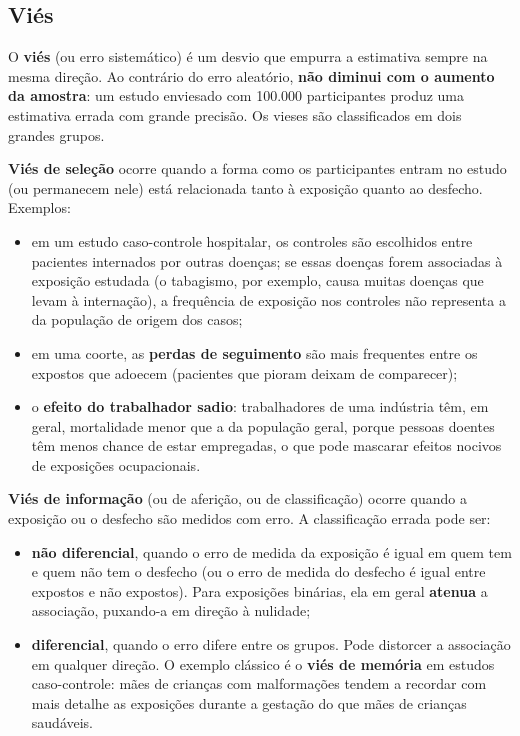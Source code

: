 \documentclass[
]{book}
\providecommand{\tightlist}{%
  \setlength{\itemsep}{0pt}\setlength{\parskip}{0pt}}
\begin{document}
\subsection{Viés}\label{viuxe9s}

O \textbf{viés} (ou erro sistemático) é um desvio que empurra a estimativa sempre na mesma direção. Ao contrário do erro aleatório, \textbf{não diminui com o aumento da amostra}: um estudo enviesado com 100.000 participantes produz uma estimativa errada com grande precisão. Os vieses são classificados em dois grandes grupos.

\textbf{Viés de seleção} ocorre quando a forma como os participantes entram no estudo (ou permanecem nele) está relacionada tanto à exposição quanto ao desfecho. Exemplos:

\begin{itemize}
\tightlist
\item
  em um estudo caso-controle hospitalar, os controles são escolhidos entre pacientes internados por outras doenças; se essas doenças forem associadas à exposição estudada (o tabagismo, por exemplo, causa muitas doenças que levam à internação), a frequência de exposição nos controles não representa a da população de origem dos casos;
\item
  em uma coorte, as \textbf{perdas de seguimento} são mais frequentes entre os expostos que adoecem (pacientes que pioram deixam de comparecer);
\item
  o \textbf{efeito do trabalhador sadio}: trabalhadores de uma indústria têm, em geral, mortalidade menor que a da população geral, porque pessoas doentes têm menos chance de estar empregadas, o que pode mascarar efeitos nocivos de exposições ocupacionais.
\end{itemize}

\textbf{Viés de informação} (ou de aferição, ou de classificação) ocorre quando a exposição ou o desfecho são medidos com erro. A classificação errada pode ser:

\begin{itemize}
\tightlist
\item
  \textbf{não diferencial}, quando o erro de medida da exposição é igual em quem tem e quem não tem o desfecho (ou o erro de medida do desfecho é igual entre expostos e não expostos). Para exposições binárias, ela em geral \textbf{atenua} a associação, puxando-a em direção à nulidade;
\item
  \textbf{diferencial}, quando o erro difere entre os grupos. Pode distorcer a associação em qualquer direção. O exemplo clássico é o \textbf{viés de memória} em estudos caso-controle: mães de crianças com malformações tendem a recordar com mais detalhe as exposições durante a gestação do que mães de crianças saudáveis.
\end{itemize}
\end{document}
